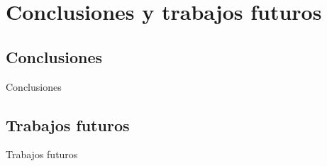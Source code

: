 \documentclass[12pt]{beamer}
\begin{document}
\section{Conclusiones y trabajos futuros}
\subsection{Conclusiones}
\begin{frame}{Conclusiones}
\end{frame}

\subsection{Trabajos futuros}
\begin{frame}{Trabajos futuros}
\end{frame}
\end{document}
